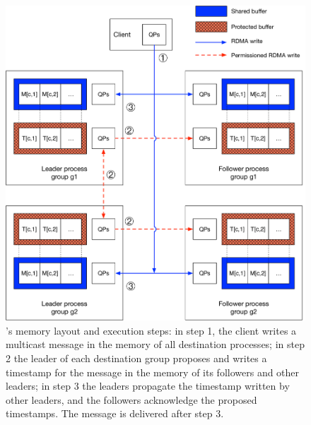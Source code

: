 \begin{figure}[ht!]
  \centering
  \includegraphics[width=1\linewidth]{figures/architecture2}
  \caption{\libname's memory layout and execution steps: in step 1, the client writes a multicast message in the memory of all destination processes; in step 2 the leader of each destination group proposes and writes a timestamp for the message in the memory of its followers and other leaders; in step 3 the leaders propagate the timestamp written by other leaders, and the followers acknowledge the proposed timestamps. The message is delivered after step 3.}
  \label{fig:arch}
\end{figure}


